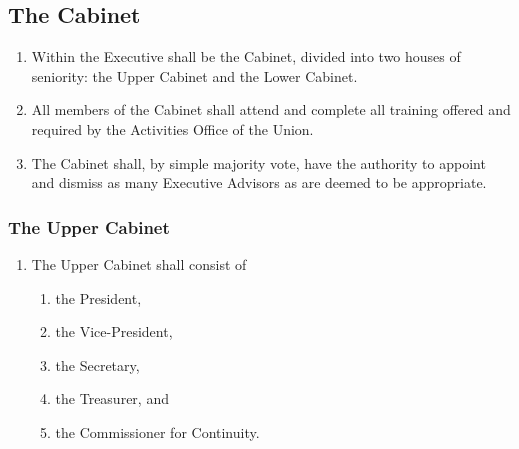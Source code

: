 \documentclass{scrartcl}
\begin{document}
        \subsection{The Cabinet}
            \label{executive--cabinet}
            \begin{enumerate}
                \item Within the Executive shall be the Cabinet, divided into two houses of seniority: the Upper Cabinet and the Lower Cabinet.
                \item All members of the Cabinet shall attend and complete all training offered and required by the Activities Office of the Union.
                \item The Cabinet shall, by simple majority vote, have the authority to appoint and dismiss as many Executive Advisors as are deemed to be appropriate.
            \end{enumerate}

            \subsubsection{The Upper Cabinet}
                \label{executive--cabinet--upper}
                \begin{enumerate}
                    \item The Upper Cabinet shall consist of
                        \begin{enumerate}
                            \item the President,
                            \item the Vice-President,
                            \item the Secretary,
                            \item the Treasurer, and
                            \item the Commissioner for Continuity.
                        \end{enumerate}
                \end{enumerate}
\end{document}
